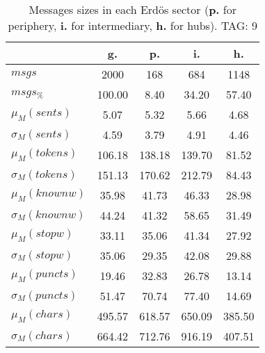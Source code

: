 \begin{table}[h!]
\begin{center}
\begin{tabular}{| l || c | c | c | c |}\hline
 & {\bf g.} & {\bf p.} & {\bf i.} & {\bf h.} \\\hline\hline
$msgs$ & 2000  & 168  & 684  & 1148 \\
$msgs_{\%}$ & 100.00  & 8.40  & 34.20  & 57.40 \\\hline
$\mu_M(sents)$ & 5.07  & 5.32  & 5.66  & 4.68 \\
$\sigma_M(sents)$ & 4.59  & 3.79  & 4.91  & 4.46 \\\hline
$\mu_M(tokens)$ & 106.18  & 138.18  & 139.70  & 81.52 \\
$\sigma_M(tokens)$ & 151.13  & 170.62  & 212.79  & 84.43 \\\hline
$\mu_M(knownw)$ & 35.98  & 41.73  & 46.33  & 28.98 \\
$\sigma_M(knownw)$ & 44.24  & 41.32  & 58.65  & 31.49 \\\hline
$\mu_M(stopw)$ & 33.11  & 35.06  & 41.34  & 27.92 \\
$\sigma_M(stopw)$ & 35.06  & 29.35  & 42.08  & 29.88 \\\hline
$\mu_M(puncts)$ & 19.46  & 32.83  & 26.78  & 13.14 \\
$\sigma_M(puncts)$ & 51.47  & 70.74  & 77.40  & 14.69 \\\hline
$\mu_M(chars)$ & 495.57  & 618.57  & 650.09  & 385.50 \\
$\sigma_M(chars)$ & 664.42  & 712.76  & 916.19  & 407.51 \\\hline
\end{tabular}
\caption{Messages sizes in each Erd\"os sector ({{\bf p.}} for periphery, {{\bf i.}} for intermediary, {{\bf h.}} for hubs). TAG: 9}
\end{center}
\end{table}